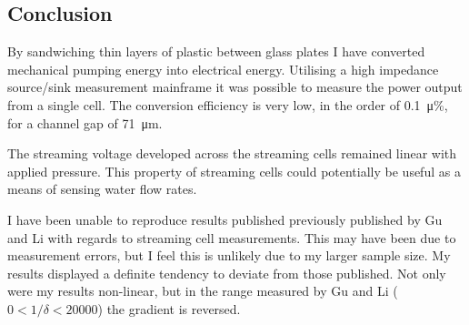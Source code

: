 







\subsection{Conclusion}
By sandwiching thin layers of plastic between glass plates I have converted mechanical pumping energy into electrical energy.
Utilising a high impedance source/sink measurement mainframe it was possible to measure the power output from a single cell.
The conversion efficiency is very low, in the order of \SI{0.1}{\micro\percent}, for a channel gap of \SI{71}{\micro\meter}.

The streaming voltage developed across the streaming cells remained linear with applied pressure.
This property of streaming cells could potentially be useful as a means of sensing water flow rates.

I have been unable to reproduce results published previously published by Gu and Li with regards to streaming cell measurements.
This may have been due to measurement errors, but I feel this is unlikely due to my larger sample size.
My results displayed a definite tendency to deviate from those published.
Not only were my results non-linear, but in the range measured by Gu and Li ($0 < 1/\delta < 20000$) the gradient is reversed.

